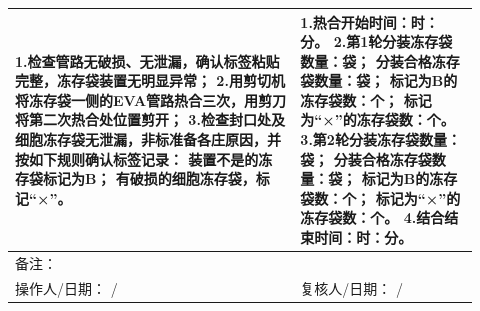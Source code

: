 \documentclass[UTF8,10pt,a4paper,fontset=fandol]{ctexart}
\newcommand{\fieldvalue}[1]{#1}
\newcommand{\handwritten}[1]{#1}
\begin{document}
\begin{center}
\begin{tabular}{|p{0.57\linewidth}|p{0.35\linewidth}|}
\hline
1.检查管路无破损、无泄漏，确认标签粘贴完整，冻存袋装置无明显异常；
\newline
2.用剪切机将冻存袋一侧的EVA管路热合三次，用剪刀将第二次热合处位置剪开；
\newline
3.检查封口处及细胞冻存袋无泄漏，非标准备各庄原因，并按如下规则确认标签记录：
\newline
装置不是的冻存袋标记为B；
\newline
有破损的细胞冻存袋，标记“×”。 &
1.热合开始时间：\underline{\hspace{1.1cm}}时：\underline{\hspace{1.1cm}}分。
\newline
2.第1轮分装冻存袋数量：\underline{\hspace{0.8cm}}袋；
\newline
分装合格冻存袋数量：\underline{\hspace{0.8cm}}袋；
\newline
标记为B的冻存袋数：\underline{\hspace{0.8cm}}个；
\newline
标记为“×”的冻存袋数：\underline{\hspace{0.8cm}}个。
\newline
3.第2轮分装冻存袋数量：\underline{\hspace{0.8cm}}袋；
\newline
分装合格冻存袋数量：\underline{\hspace{0.8cm}}袋；
\newline
标记为B的冻存袋数：\underline{\hspace{0.8cm}}个；
\newline
标记为“×”的冻存袋数：\underline{\hspace{0.8cm}}个。
\newline
4.结合结束时间：\underline{\hspace{1.1cm}}时：\underline{\hspace{1.1cm}}分。
\tabularnewline
\hline
备注： & \tabularnewline
\hline
操作人/日期：%
\newline
\fieldvalue{\handwritten{/}} &
复核人/日期：%
\newline
\fieldvalue{\handwritten{/}}
\tabularnewline
\hline
\end{tabular}
\end{center}
\end{document}
